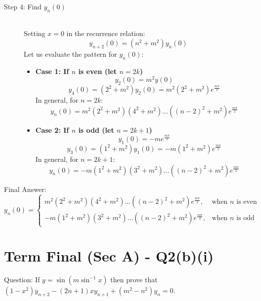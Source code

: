 \documentclass[11pt, a4paper]{article}
\begin{document}
\begin{description}
    \item[Step 4: Find $y_n(0)$] \ \\
    Setting $x=0$ in the recurrence relation:
    \[ y_{n+2}(0) = (n^2 + m^2)y_n(0) \]
    Let us evaluate the pattern for $y_n(0)$:
    \begin{itemize}
        \item \textbf{Case 1: If $n$ is even (let $n = 2k$)}
        \[ y_2(0) = m^2 y(0) \]
        \[ y_4(0) = (2^2 + m^2)y_2(0) = m^2 (2^2 + m^2) e^{\frac{m\pi}{2}} \]
        In general, for $n = 2k$:
        \[ y_n(0) = m^2 (2^2 + m^2)(4^2 + m^2) \dots ((n-2)^2 + m^2) e^{\frac{m\pi}{2}} \]

        \item \textbf{Case 2: If $n$ is odd (let $n = 2k+1$)}
        \[ y_1(0) = -m e^{\frac{m\pi}{2}} \]
        \[ y_3(0) = (1^2 + m^2)y_1(0) = -m(1^2 + m^2) e^{\frac{m\pi}{2}} \]
        In general, for $n = 2k+1$:
        \[ y_n(0) = -m (1^2 + m^2)(3^2 + m^2) \dots ((n-2)^2 + m^2) e^{\frac{m\pi}{2}} \]
    \end{itemize}
\end{description}

Final Answer:
\[ 
\boxed{y_n(0) = \begin{cases} 
m^2 (2^2+m^2)(4^2+m^2)\dots((n-2)^2+m^2) e^{\frac{m\pi}{2}}, & \text{when } n \text{ is even} \\ 
-m (1^2+m^2)(3^2+m^2)\dots((n-2)^2+m^2) e^{\frac{m\pi}{2}}, & \text{when } n \text{ is odd} 
\end{cases}} 
\]



\section*{Term Final (Sec A) - Q2(b)(i)}

Question:
If $y = \sin(m\sin^{-1}x)$ then prove that $(1-x^2)y_{n+2} - (2n+1)xy_{n+1} + (m^2 - n^2)y_n = 0$.
\end{document}
